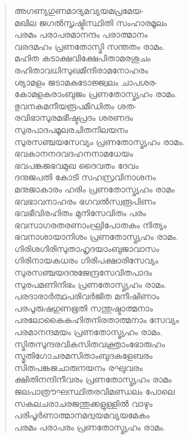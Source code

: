 \begin{verse}
അഗണ്യഗുണമാദ്യമവ്യയമപ്രമേയ-\\
മഖില ജഗല്‍സൃഷ്ടിസ്ഥിതി സംഹാരമൂലം\\
പരമം പരാപരമാനന്ദം പരാത്മാനം\\
വരദമഹം പ്രണതോസ്മി സന്തതം രാമം.\\
മഹിത കടാക്ഷവിക്ഷേപിതാമരശുചം\\
രഹിതാവധിസുഖമിന്ദിരാമനോഹരം\\
ശ്യാമളം ജടാമകുടോജ്ജ്വലം ചാപശര-\\
കോമളകരാംബുജം പ്രണതോസ്മ്യഹം രാമം.\\
ഭുവനകമനീയരൂപമീഡിതം ശത-\\
രവിഭാസുരമഭീഷ്ടപ്രദം ശരണദം\\
സുരപാദപമൂലരചിതനിലയനം\\
സുരസഞ്ചയസേവ്യം പ്രണതോസ്മ്യഹം രാമം.\\
ഭവകാനനദവദഹനനാമധേയം\\
ഭവപങ്കജഭവമുഖ ദൈവതം ദേവം\\
ദനുജപതി കോടി സഹസ്രവിനാശനം\\
മനുജാകാരം ഹരിം പ്രണതോസ്മ്യഹം രാമം\\
ഭവഭാവനാഹരം ഭഗവല്‍സ്വരൂപിണം\\
ഭവഭീവിരഹിതം മുനിസേവിതം പരം\\
ഭവസാഗരതരണാംഘ്രിപോതകം നിത്യം\\
ഭവനാശായാനിശം പ്രണതോസ്മ്യഹം രാമം.\\
ഗിരിശഗിരിസുതാഹൃദയാംബുജാവാസം\\
ഗിരിനായകധരം ഗിരിപക്ഷാരിസേവ്യം\\
സുരസഞ്ചയദനുജേന്ദ്രസേവിതപാദം\\
സുരപമണിനിഭം പ്രണതോസ്മ്യഹം രാമം.\\
പരദാരാര്‍ത്ഥപരിവര്‍ജിത മനീഷിണാം\\
പരപൂരുഷഗുണഭൂതി സന്തുഷ്ടാത്മനാം\\
പരലോകൈകഹിതനിരതാത്മനാം സേവ്യം\\
പരമാനന്ദമയം പ്രണതോസ്മ്യഹം രാമം.\\
സ്മിതസുന്ദരവികസിതവക്ത്രാംഭോരുഹം\\
സ്മൃതിഗോചരമസിതാംബുദകളേബരം\\
സിതപങ്കജചാരുനയനം രഘുവരം\\
ക്ഷിതിനന്ദിനീവരം പ്രണതോസ്മ്യഹം രാമം\\
ജലപാത്രൗഘസ്ഥിതരവിമണ്ഡലം പോലെ\\
സകലചരാചരജന്തുക്കളുള്ളില്‍ വാഴും\\
പരിപൂര്‍ണാത്മാനമദ്വയമവ്യയമേകം\\
പരമം പരാപരം പ്രണതോസ്മ്യഹം രാമം.\\

\end{verse}
